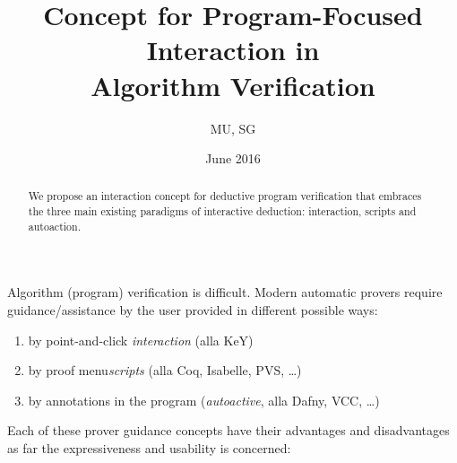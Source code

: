 \documentclass{article}
\begin{document}
\title{Concept for Program-Focused Interaction in \\Algorithm Verification}
\author{MU, SG}
\date{June 2016}

\maketitle

\begin{abstract}
  We propose an interaction concept for deductive program verification
  that embraces the three main existing paradigms of interactive
  deduction: interaction, scripts and autoaction.
\end{abstract}

Algorithm (program) verification is difficult. Modern automatic
provers require guidance/assistance by the user provided in different
possible ways:
\begin{enumerate}
\item by point-and-click \emph{interaction} (alla KeY)
\item by proof menu\emph{scripts} (alla Coq, Isabelle, PVS, \dots)
\item by annotations in the program (\emph{autoactive}, alla Dafny, VCC, \ldots)
\end{enumerate}

Each of these prover guidance concepts have their advantages and
disadvantages as far the expressiveness and usability is concerned:
\end{document}
